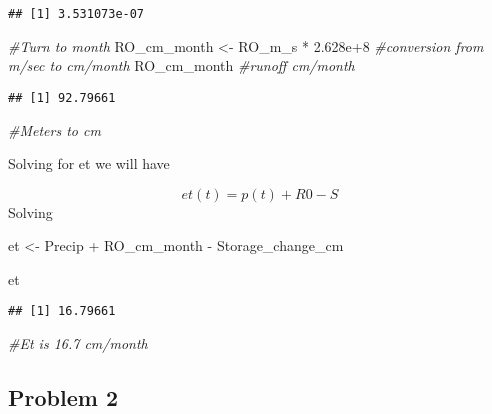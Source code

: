 \documentclass[
]{article}
\newenvironment{Shaded}{\begin{snugshade}}{\end{snugshade}}
\newcommand{\CommentTok}[1]{\textcolor[rgb]{0.56,0.35,0.01}{\textit{#1}}}
\newcommand{\FloatTok}[1]{\textcolor[rgb]{0.00,0.00,0.81}{#1}}
\newcommand{\NormalTok}[1]{#1}
\newcommand{\OtherTok}[1]{\textcolor[rgb]{0.56,0.35,0.01}{#1}}
\newcommand{\SpecialCharTok}[1]{\textcolor[rgb]{0.00,0.00,0.00}{#1}}
\begin{document}
\begin{verbatim}
## [1] 3.531073e-07
\end{verbatim}

\begin{Shaded}
\begin{Highlighting}[]
\CommentTok{\#Turn to month}
\NormalTok{RO\_cm\_month }\OtherTok{\textless{}{-}}\NormalTok{ RO\_m\_s }\SpecialCharTok{*} \FloatTok{2.628e+8} \CommentTok{\#conversion from m/sec to cm/month}
\NormalTok{RO\_cm\_month }\CommentTok{\#runoff cm/month}
\end{Highlighting}
\end{Shaded}

\begin{verbatim}
## [1] 92.79661
\end{verbatim}

\begin{Shaded}
\begin{Highlighting}[]
\CommentTok{\#Meters to cm}
\end{Highlighting}
\end{Shaded}

Solving for et we will have

\[ et(t) = p(t) + R0 - S\] Solving

\begin{Shaded}
\begin{Highlighting}[]
\NormalTok{et }\OtherTok{\textless{}{-}}\NormalTok{ Precip }\SpecialCharTok{+}\NormalTok{ RO\_cm\_month }\SpecialCharTok{{-}}\NormalTok{ Storage\_change\_cm}

\NormalTok{et }
\end{Highlighting}
\end{Shaded}

\begin{verbatim}
## [1] 16.79661
\end{verbatim}

\begin{Shaded}
\begin{Highlighting}[]
\CommentTok{\#Et is 16.7 cm/month}
\end{Highlighting}
\end{Shaded}

\hypertarget{problem-2}{%
\subsection{Problem 2}\label{problem-2}}
\end{document}
